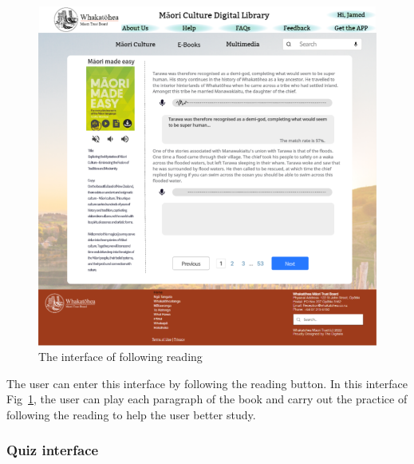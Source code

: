 \begin{figure}[htbp]
  \centerline{\includegraphics[width=400pt]{images/3-2-3.png}}
  \caption{The interface of following reading}
  \label{fig3.2.3}
\end{figure}

The user can enter this interface by following the reading button. In this interface Fig~\ref{fig3.2.3}, the user can play each paragraph of the book and carry out the practice of following the reading to help the user better study.

\subsubsection{Quiz interface}

